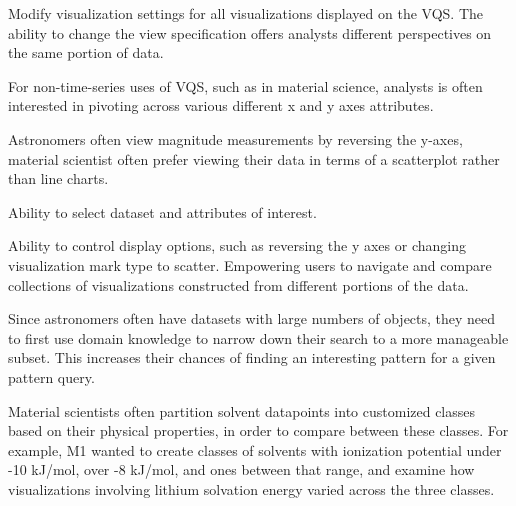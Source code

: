  Modify visualization settings for all visualizations displayed on the VQS. The ability to change the view specification offers analysts different perspectives on the same portion of data.
\problemlist
  \item For non-time-series uses of VQS, such as in material science, analysts is often interested in pivoting across various different x and y axes attributes.
  \item Astronomers often view magnitude measurements by reversing the y-axes, material scientist often prefer viewing their data in terms of a scatterplot rather than line charts.
\enumend
\featurelist
  \item Ability to select dataset and attributes of interest.
  \item Ability to control display options, such as reversing the y axes or changing visualization mark type to scatter.
\enumend
 Empowering users to navigate and compare collections of visualizations constructed from different portions of the data.
\problemlist
  \item Since astronomers often have datasets with large numbers of objects, they need to first use domain knowledge
  to narrow down their search to a more manageable subset. This increases their chances of finding an interesting pattern for a given pattern query.
  \item Material scientists often partition solvent datapoints into customized classes based on their physical properties, in order to compare between these classes. For example, M1 wanted to create classes of solvents with ionization potential under -10 kJ/mol, over -8 kJ/mol, and ones between that range, and examine how visualizations involving lithium solvation energy varied across the three classes.
